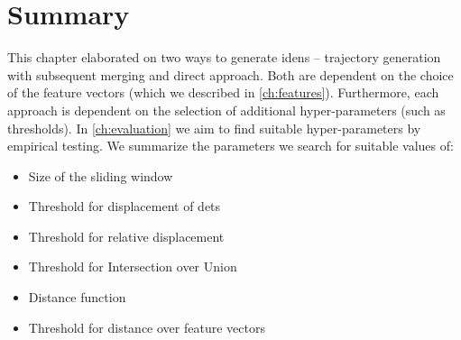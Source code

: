 \section{Summary}

This chapter elaborated on two ways to generate \glspl{iden} -- trajectory generation with subsequent merging and direct approach. Both are dependent on the choice of the feature vectors (which we described in \autoref{ch:features}). Furthermore, each approach is dependent on the selection of additional hyper-parameters (such as thresholds). In \autoref{ch:evaluation} we aim to find suitable hyper-parameters by empirical testing. We summarize the parameters we search for suitable values of:

\begin{itemize}
    \item Size of the sliding window
    \item Threshold for displacement of \glspl{det}
    \item Threshold for relative displacement
    \item Threshold for Intersection over Union
    \item Distance function
    \item Threshold for distance over feature vectors
\end{itemize}